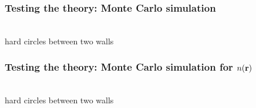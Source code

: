 \begin{frame}
  \frametitle{Testing the theory:  Monte Carlo simulation}
  \vspace{-0.8em}
  \begin{center}
    \\
    \vspace{-2.0em}
    hard circles between two walls
  \end{center}
\end{frame}

\begin{frame}
  \frametitle{Testing the theory:  Monte Carlo simulation for $n(\mathbf{r})$}
  \vspace{-0.8em}
  \begin{center}
    \\
    \vspace{-2.0em}
    hard circles between two walls
  \end{center}
\end{frame}

